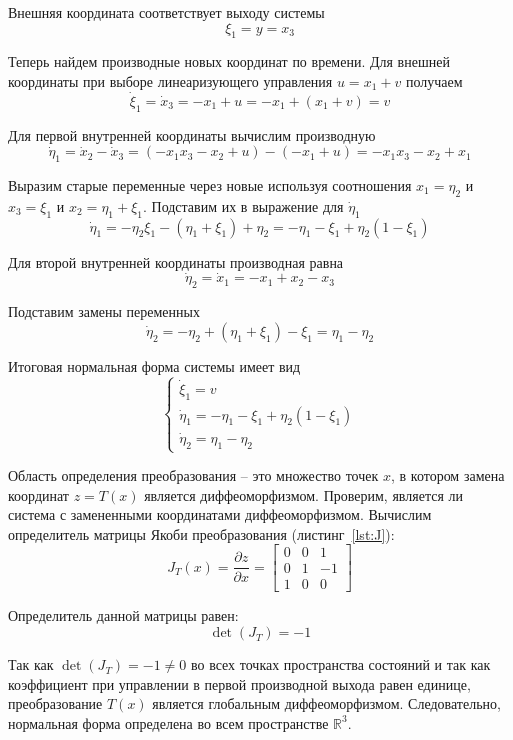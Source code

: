 \documentclass[a4paper,12pt]{article}
\begin{document}
Внешняя координата соответствует выходу системы
$$ \xi_1 = y = x_3 $$

Теперь найдем производные новых координат по времени. Для внешней координаты при выборе линеаризующего управления $u = x_1 + v$ получаем
$$ \dot{\xi}_1 = \dot{x}_3 = -x_1 + u = -x_1 + (x_1 + v) = v $$

Для первой внутренней координаты вычислим производную
$$ \dot{\eta}_1 = \dot{x}_2 - \dot{x}_3 = (-x_1 x_3 - x_2 + u) - (-x_1 + u) = -x_1 x_3 - x_2 + x_1 $$

Выразим старые переменные через новые используя соотношения $x_1=\eta_2$ и $x_3=\xi_1$ и $x_2=\eta_1+\xi_1$. Подставим их в выражение для $\dot{\eta}_1$
$$ \dot{\eta}_1 = -\eta_2 \xi_1 - (\eta_1 + \xi_1) + \eta_2 = -\eta_1 - \xi_1 + \eta_2(1 - \xi_1) $$

Для второй внутренней координаты производная равна
$$ \dot{\eta}_2 = \dot{x}_1 = -x_1 + x_2 - x_3 $$

Подставим замены переменных
$$ \dot{\eta}_2 = -\eta_2 + (\eta_1 + \xi_1) - \xi_1 = \eta_1 - \eta_2 $$

Итоговая нормальная форма системы имеет вид
\begin{equation}
	\begin{cases}
		\dot{\xi}_1 = v \\
		\dot{\eta}_1 = -\eta_1 - \xi_1 + \eta_2(1 - \xi_1) \\
		\dot{\eta}_2 = \eta_1 - \eta_2
	\end{cases}
\end{equation}

Область определения преобразования -- это множество точек $x$, в котором замена координат $z = T(x)$ является диффеоморфизмом. Проверим,  является ли система с замененными координатами диффеоморфизмом. Вычислим определитель матрицы Якоби преобразования (листинг~\ref{lst:J}):
$$ J_T(x) = \frac{\partial z}{\partial x} = \begin{bmatrix} 
	0 & 0 & 1 \\ 
	0 & 1 & -1 \\ 
	1 & 0 & 0 \end{bmatrix} $$

Определитель данной матрицы равен:
$$ \det(J_T) = -1 $$

Так как $\det(J_T) = -1 \neq 0$ во всех точках пространства состояний и так как коэффициент при управлении в первой производной выхода равен единице, преобразование $T(x)$ является глобальным диффеоморфизмом. Следовательно, нормальная форма определена во всем пространстве $\mathbb{R}^3$.
\end{document}
